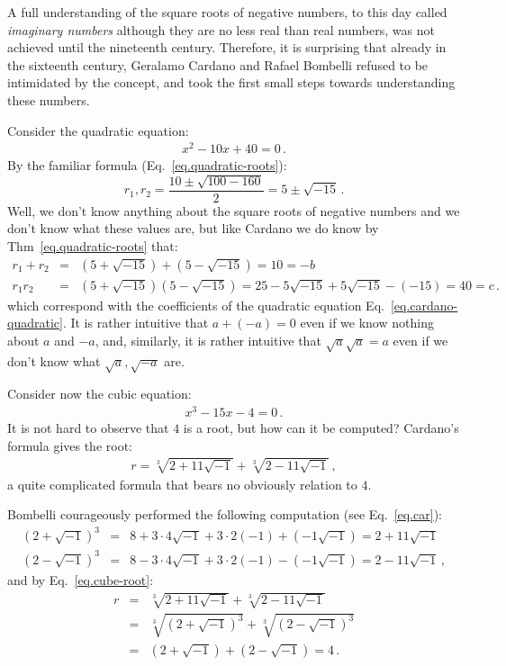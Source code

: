 A full understanding of the square roots of negative numbers, to this day called \emph{imaginary numbers} although they are no less real than real numbers, was not achieved until the nineteenth century. Therefore, it is surprising that already in the sixteenth century, Geralamo Cardano and Rafael Bombelli refused to be intimidated by the concept, and took the first small steps towards understanding these numbers.

Consider the quadratic equation:
\begin{align}
x^2-10x+40=0\,.\label{eq.cardano-quadratic}
\end{align}
By the familiar formula (Eq.~\ref{eq.quadratic-roots}):
\[
r_1, r_2=\displaystyle\frac{10\pm\sqrt{100-160}}{2}=5\pm\sqrt{-15}\,.
\]
Well, we don't know anything about the square roots of negative numbers and we don't know what these values are, but like Cardano we do know by Thm~\ref{eq.quadratic-roots} that:
\[
\begin{array}{lcl}
r_1+r_2&=&(5+\sqrt{-15})+(5-\sqrt{-15})=10=-b\\
r_1r_2&=&(5+\sqrt{-15})(5-\sqrt{-15})=25-5\sqrt{-15}+5\sqrt{-15}-(-15)=40=c\,.
\end{array}
\]
which correspond with the coefficients of the quadratic equation Eq.~\ref{eq.cardano-quadratic}. It is rather intuitive that $a+(-a)=0$ even if we know nothing about $a$ and $-a$, and, similarly, it is rather intuitive that $\sqrt{a}\sqrt{a}=a$ even if we don't know what $\sqrt{a},\sqrt{-a}$ are.

\enlargethispage{\baselineskip}

Consider now the cubic equation:
\begin{align}
x^3-15x-4=0\,.\label{eq.bombelli-cubic}
\end{align}
It is not hard to observe that $4$ is a root, but how can it be computed? Cardano's formula gives the root:
\begin{align}
r=\sqrt[3]{2+11\sqrt{-1}}+\sqrt[3]{2-11\sqrt{-1}}\,,\label{eq.cube-root}
\end{align}
a quite complicated formula that bears no obviously relation to $4$. 

Bombelli courageously performed the following computation (see Eq.~\ref{eq.car}):
\begin{eqnarray*}
(2+\sqrt{-1})^3&=&
8+3\cdot 4\sqrt{-1}+3\cdot 2(-1)+(-1\sqrt{-1})=
2+11\sqrt{-1}\\
(2-\sqrt{-1})^3&=&
8-3\cdot 4\sqrt{-1}+3\cdot 2(-1)-(-1\sqrt{-1})=
2-11\sqrt{-1}\,,
\end{eqnarray*}
and by Eq.~\ref{eq.cube-root}:
\begin{eqnarray*}
r&=&\sqrt[3]{2+11\sqrt{-1}} + \sqrt[3]{2-11\sqrt{-1}}\\
&=&\sqrt[3]{(2+\sqrt{-1})^3} + \sqrt[3]{(2-\sqrt{-1})^3}\\
&=&(2+\sqrt{-1}) + (2-\sqrt{-1})=4\,.
\end{eqnarray*}


